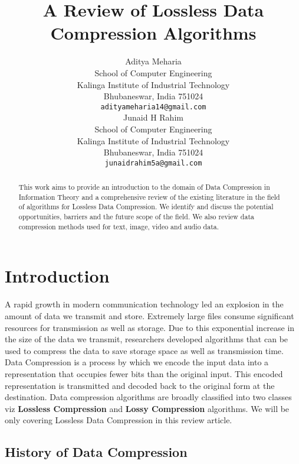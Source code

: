 \documentclass{article}
\title{A Review of Lossless Data Compression Algorithms}
\author{
	Aditya Meharia\\
	School of Computer Engineering\\
	Kalinga Institute of Industrial Technology\\
	Bhubaneswar, India 751024 \\
	\texttt{adityameharia14@gmail.com} \\
	\And
   	Junaid H Rahim\\
	School of Computer Engineering\\
	Kalinga Institute of Industrial Technology\\
	Bhubaneswar, India 751024 \\
	\texttt{junaidrahim5a@gmail.com} \\	
}
\begin{document}
\maketitle

\begin{abstract}
	

This work aims to provide an introduction to the domain of Data Compression in Information Theory and a comprehensive review of the existing literature in the field of algorithms for Lossless Data Compression. We identify and discuss the potential opportunities, barriers and the future scope of the field. We also review data compression methods used for text, image, video and  audio data.




\end{abstract}



\section{Introduction}

A rapid growth in modern communication technology led an explosion in the amount of data we transmit and store. Extremely large files consume significant resources for transmission as well as storage. Due to this exponential increase in the size of the data we transmit, researchers developed algorithms that can be used to compress the data to save storage space as well as transmission time. Data Compression is a process by which we encode the input data into a representation that occupies fewer bits than the original input. This encoded representation is transmitted and decoded back to the original form at the destination. Data compression algorithms are broadly classified into two classes viz \textbf{Lossless Compression} and \textbf{Lossy Compression} algorithms. We will be only covering Lossless Data Compression in this review article.

\subsection{History of Data Compression}
\end{document}
